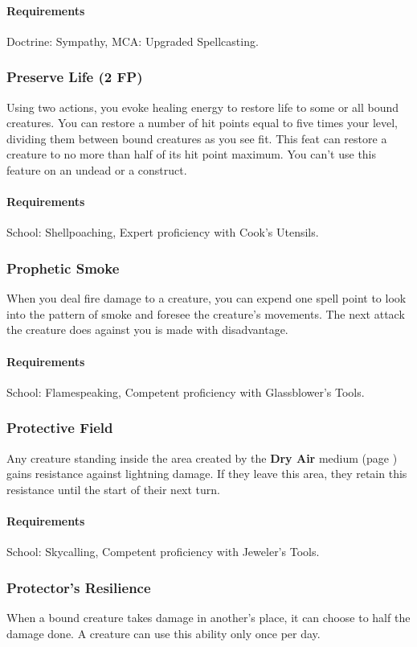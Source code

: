    \paragraph{Requirements} Doctrine: Sympathy, MCA: Upgraded Spellcasting.
\subsubsection{Preserve Life (2 FP)} \label{feat::preservelife}
    Using two actions, you evoke healing energy to restore life to some or all bound creatures.
    You can restore a number of hit points equal to five times your level, dividing them between bound creatures as you see fit.
    This feat can restore a creature to no more than half of its hit point maximum.
    You can't use this feature on an undead or a construct.
    \paragraph{Requirements} School: Shellpoaching, Expert proficiency with Cook's Utensils.
\subsubsection{Prophetic Smoke} \label{feat::propheticsmoke}
    When you deal fire damage to a creature, you can expend one spell point to look into the pattern of smoke and foresee the creature's movements.
    The next attack the creature does against you is made with disadvantage.
    \paragraph{Requirements} School: Flamespeaking, Competent proficiency with Glassblower's Tools.
\subsubsection{Protective Field} \label{feat::protectivefield}
    Any creature standing inside the area created by the \textbf{Dry Air} medium (page \pageref{medium::dryair}) gains resistance against lightning damage.
    If they leave this area, they retain this resistance until the start of their next turn.
    \paragraph{Requirements} School: Skycalling, Competent proficiency with Jeweler's Tools.
\subsubsection{Protector's Resilience} \label{feat::protectorsresilience}
    When a bound creature takes damage in another's place, it can choose to half the damage done.
    A creature can use this ability only once per day.
